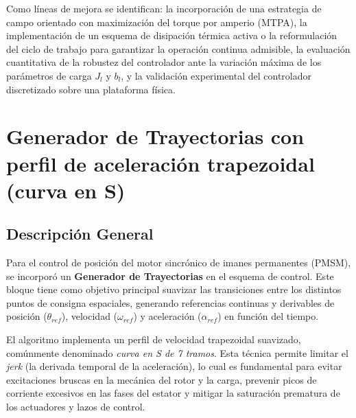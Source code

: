 \documentclass[12pt, a4paper,journal, onecolumn, compsoc]{IEEEtran}
\begin{document}
Como líneas de mejora se identifican: la incorporación de una estrategia de campo orientado con maximización del torque por amperio (MTPA), la implementación de un esquema de disipación térmica activa o la reformulación del ciclo de trabajo para garantizar la operación continua admisible, la evaluación cuantitativa de la robustez del controlador ante la variación máxima de los parámetros de carga $J_l$ y $b_l$, y la validación experimental del controlador discretizado sobre una plataforma física.











\appendices
\section{Generador de Trayectorias con perfil de aceleración trapezoidal (curva en S)}
\subsection{Descripción General}
Para el control de posición del motor sincrónico de imanes permanentes (PMSM), se incorporó un \textbf{Generador de Trayectorias} en el esquema de control. Este bloque tiene como objetivo principal suavizar las transiciones entre los distintos puntos de consigna espaciales, generando referencias continuas y derivables de posición ($\theta_{ref}$), velocidad ($\omega_{ref}$) y aceleración ($\alpha_{ref}$) en función del tiempo. 

El algoritmo implementa un perfil de velocidad trapezoidal suavizado, comúnmente denominado \textit{curva en S de 7 tramos}. Esta técnica permite limitar el \textit{jerk} (la derivada temporal de la aceleración), lo cual es fundamental para evitar excitaciones bruscas en la mecánica del rotor y la carga, prevenir picos de corriente excesivos en las fases del estator y mitigar la saturación prematura de los actuadores y lazos de control.
\end{document}
